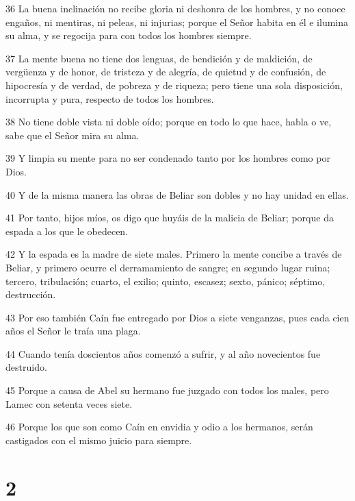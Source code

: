 \par 36 La buena inclinación no recibe gloria ni deshonra de los hombres, y no conoce engaños, ni mentiras, ni peleas, ni injurias; porque el Señor habita en él e ilumina su alma, y ​​se regocija para con todos los hombres siempre.

\par 37 La mente buena no tiene dos lenguas, de bendición y de maldición, de vergüenza y de honor, de tristeza y de alegría, de quietud y de confusión, de hipocresía y de verdad, de pobreza y de riqueza; pero tiene una sola disposición, incorrupta y pura, respecto de todos los hombres.

\par 38 No tiene doble vista ni doble oído; porque en todo lo que hace, habla o ve, sabe que el Señor mira su alma.

\par 39 Y limpia su mente para no ser condenado tanto por los hombres como por Dios.

\par 40 Y de la misma manera las obras de Beliar son dobles y no hay unidad en ellas.

\par 41 Por tanto, hijos míos, os digo que huyáis de la malicia de Beliar; porque da espada a los que le obedecen.

\par 42 Y la espada es la madre de siete males. Primero la mente concibe a través de Beliar, y primero ocurre el derramamiento de sangre; en segundo lugar ruina; tercero, tribulación; cuarto, el exilio; quinto, escasez; sexto, pánico; séptimo, destrucción.

\par 43 Por eso también Caín fue entregado por Dios a siete venganzas, pues cada cien años el Señor le traía una plaga.

\par 44 Cuando tenía doscientos años comenzó a sufrir, y al año novecientos fue destruido.

\par 45 Porque a causa de Abel su hermano fue juzgado con todos los males, pero Lamec con setenta veces siete.

\par 46 Porque los que son como Caín en envidia y odio a los hermanos, serán castigados con el mismo juicio para siempre.

\chapter{2}

